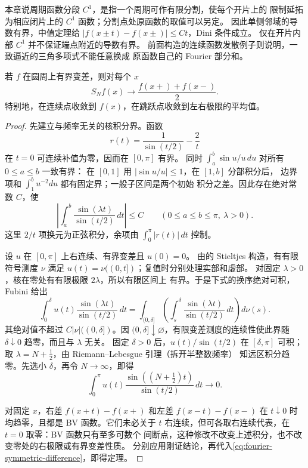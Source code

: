 本章说周期函数分段 \(C^1\)，是指一个周期可作有限分割，使每个开片上的
限制延拓为相应闭片上的 \(C^1\) 函数；分割点处原函数的取值可以另定。
因此单侧邻域的导数有界，中值定理给
\(|f(x\pm t)-f(x\pm)|\le Ct\)，Dini 条件成立。
仅在开片内部 \(C^1\) 并不保证端点附近的导数有界。
前面构造的连续函数发散例子则说明，一致逼近的三角多项式不能任意换成
原函数自己的 Fourier 部分和。

\begin{theorem}\label{thm:dirichlet-jordan}
若 \(f\) 在圆周上有界变差，则对每个 \(x\)
\[
 S_Nf(x)\longrightarrow\frac{f(x+)+f(x-)}2.
\]
特别地，在连续点收敛到 \(f(x)\)，在跳跃点收敛到左右极限的平均值。
\end{theorem}
\begin{proof}
先建立与频率无关的核积分界。函数
\[
 r(t)=\frac1{\sin(t/2)}-\frac2t
\]
在 \(t=0\) 可连续补值为零，因而在 \([0,\pi]\) 有界。
同时 \(\int_a^b\sin u/u\,du\) 对所有 \(0\le a\le b\) 一致有界：
在 \([0,1]\) 用 \(|\sin u/u|\le1\)，在 \([1,b]\) 分部积分后，
边界项和 \(\int_1^b u^{-2}du\) 都有固定界；一般子区间是两个初始
积分之差。因此存在绝对常数 \(C\)，使
\[
 \left|\int_a^b\frac{\sin(\lambda t)}{\sin(t/2)}\,dt\right|
 \le C\qquad(0\le a\le b\le\pi,\ \lambda>0).
\]
这里 \(2/t\) 项换元为正弦积分，余项由
\(\int_0^\pi|r(t)|\,dt\) 控制。

设 \(u\) 在 \([0,\pi]\) 上右连续、有界变差且 \(u(0)=0\)。
由的 Stieltjes 构造，有有限符号测度
\(\nu\) 满足 \(u(t)=\nu((0,t])\)；复值时分别处理实部和虚部。
对固定 \(\lambda>0\)，核在零处有有限极限 \(2\lambda\)，所以有限区间上
有界。于是下式的换序绝对可积，Fubini 给出
\[
 \int_0^\delta u(t)\frac{\sin(\lambda t)}{\sin(t/2)}\,dt
 =\int_{(0,\delta]}
       \left(\int_s^\delta\frac{\sin(\lambda t)}{\sin(t/2)}\,dt\right)d\nu(s).
\]
其绝对值不超过 \(C|\nu|((0,\delta])\)。因
\((0,\delta]\downarrow\varnothing\)，有限变差测度的连续性使此界随
\(\delta\downarrow0\) 趋零，而且与 \(\lambda\) 无关。
固定 \(\delta>0\) 后，\(u(t)/\sin(t/2)\) 在 \([\delta,\pi]\) 可积；
取 \(\lambda=N+\tfrac12\)，由 Riemann--Lebesgue 引理（拆开半整数频率）
知远区积分趋零。先选小 \(\delta\)，再令 \(N\to\infty\)，即得
\[
 \int_0^\pi u(t)\frac{\sin((N+\tfrac12)t)}{\sin(t/2)}\,dt\longrightarrow0.
\]

对固定 \(x\)，右差 \(f(x+t)-f(x+)\) 和左差 \(f(x-t)-f(x-)\)
在 \(t\downarrow0\) 时均趋零，且都是 BV 函数。它们未必关于 \(t\)
右连续，但可各取右连续代表，在 \(t=0\) 取零：BV 函数只有至多可数个
间断点，这种修改不改变上述积分，也不改变零处的右极限或有界变差性质。
分别应用刚证结论，再代入\eqref{eq:fourier-symmetric-difference}，即得定理。
\end{proof}

